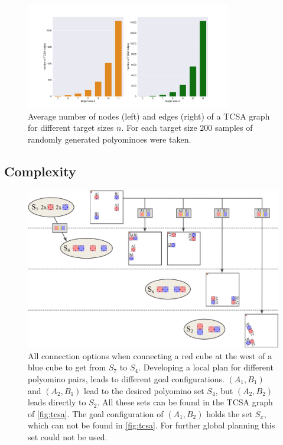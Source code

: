 \begin{figure}
	\centering
	\includegraphics[width=0.80\textwidth]{figures/plots/tcsa_nodes_edges.pdf}
	\caption[Average TCSA nodes and edges for target size $n$.]{Average number of nodes (left) and edges (right) of a TCSA graph for different target sizes $n$.
	For each target size $200$ samples of randomly generated polyominoes were taken.}
	\label{fig:tcsa_plot}
\end{figure}

\subsection{Complexity}



\begin{figure}
	\centering
	\includegraphics[width=1\textwidth]{figures/connect_options.pdf}
	\caption[Example of connection options for one TCSA edge]{All connection options when connecting a red cube at the west of a blue cube to get from $S_7$ to $S_4$. Developing a local plan for different polyomino pairs, leads to different goal configurations. $(A_1,B_1)$ and $(A_2,B_1)$ lead to the desired polyomino set $S_4$, but $(A_2,B_2)$ leads directly to $S_2$. All these sets can be found in the TCSA graph of \autoref{fig:tcsa}. The goal configuration of $(A_1, B_2)$ holds the set $S_x$, which can not be found in \autoref{fig:tcsa}. For further global planning this set could not be used.}
	\label{fig:connect_options}
\end{figure}


